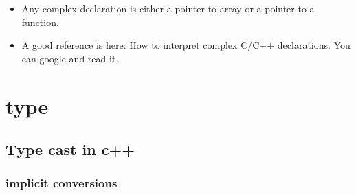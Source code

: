 \documentclass[a4paper,11pt,twoside]{book}
\begin{document}
\begin{itemize}
	\item Any complex declaration is either a pointer to array or a pointer to a function.  
	
	\item A good reference is here: How to interpret complex C/C++ declarations. You can google and read it. 
	

\end{itemize}

\section{type}


\subsection{Type cast in c++}
\subsubsection{implicit conversions}
\end{document}
